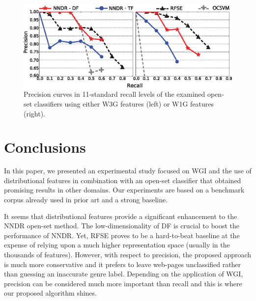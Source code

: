 \documentclass[runningheads]{llncs}
\begin{document}

\begin{figure}[t]
\begin{center}
    \includegraphics[scale=0.95]{NNDR_W3G-W1G_Best_RFSE-OCSVM-Baselines.eps}
	\caption{Precision curves in 11-standard recall levels of the examined open-set classifiers using either W3G features (left) or W1G features (right).}
	\label{fig:NNDR_W3G_Best_RFSE_Baseline}
	\end{center}
\vspace{-7mm}
\end{figure}




\section{Conclusions}\label{sec:conclusions}

In this paper, we presented an experimental study focused on WGI and the use of distributional features in combination with an open-set classifier that obtained promising results in other domains. Our experiments are based on a benchmark corpus already used in prior art and a strong baseline. 

It seems that distributional features provide a significant enhancement to the NNDR open-set method. The low-dimensionality of DF is crucial to boost the performance of NNDR. Yet, RFSE proves to be a hard-to-beat baseline at the expense of relying upon a much higher representation space (usually in the thousands of features). However, with respect to precision, the proposed approach is much more conservative and it prefers to leave web-pages unclassified rather than guessing an inaccurate genre label. Depending on the application of WGI, precision can be considered much more important than recall and this is where our proposed algorithm shines. 
\end{document}

